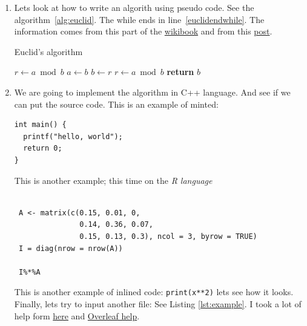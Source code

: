 \begin{enumerate}
\item Lets look at how to write an algorith using pseudo code. See the algorithm~\ref{alg:euclid}. The while ends in line~\ref{euclidendwhile}. The information comes from this part of the \href{https://en.wikibooks.org/wiki/LaTeX/Algorithms#Typesetting_using_the_algorithmicx_package}{wikibook} and from this \href{https://tex.stackexchange.com/questions/229355/algorithm-algorithmic-algorithmicx-algorithm2e-algpseudocode-confused}{post}.

\begin{algorithm}
  \caption{Euclid's algorithm}
  \label{alg:euclid}
  \begin{algorithmic}[1] %
     
      \State $r\gets a \bmod b$
       
        \State $a \gets b$
        \State $b \gets r$
        \State $r \gets a \bmod b$
      \EndWhile\label{euclidendwhile}
      \State \textbf{return} $b$
    \EndProcedure
  \end{algorithmic}
\end{algorithm}

\item We are going to implement the algorithm in C++ language. And see if we can put the source code. This is an example of minted:
\begin{verbatim}
int main() {
  printf("hello, world");
  return 0;
}
\end{verbatim}

This is another example; this time on the \emph{R language}

\begin{verbatim}

 A <- matrix(c(0.15, 0.01, 0,
               0.14, 0.36, 0.07,
               0.15, 0.13, 0.3), ncol = 3, byrow = TRUE)
 I = diag(nrow = nrow(A))

 I%*%A
\end{verbatim}

This is another example of inlined code: \texttt{print(x**2)} lets see how it looks. Finally, lets try to input another file: See Listing \ref{lst:example}. I took a lot of help form \href{https://tex.stackexchange.com/questions/252263/alignment-of-minted-line-numbers}{here} and \href{https://www.overleaf.com/learn/latex/Code_Highlighting_with_minted}{Overleaf help}.

\end{enumerate}
